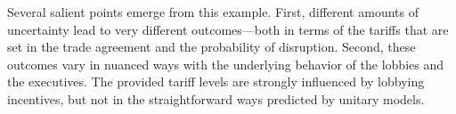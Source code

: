 \documentclass[10pt]{article}
\newtheorem{result}{Result}
\newcommand{\ve}{\theta}
\newcommand{\ga}{\gamma}
\begin{document}
Several salient points emerge from this example. First, different amounts of uncertainty lead to very different outcomes---both in terms of the tariffs that are set in the trade agreement and the probability of disruption. Second, these outcomes vary in nuanced ways with the underlying behavior of the lobbies and the executives. The provided tariff levels are strongly influenced by lobbying incentives, but not in the straightforward ways predicted by unitary models.

\end{document}
